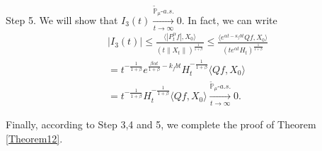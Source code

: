\documentclass[12pt]{amsart}
\theoremstyle{plain}
\theoremstyle{definition}
\numberwithin{equation}{section}
\begin{document}
	Step 5. We will show that $I_3(t) \xrightarrow[t\to \infty]{\tilde {\mathbb P}_\mu \text{-} a.s.} 0$. 
	In fact, we can write
\begin{align}
	&|I_3(t)| 
	\leq \frac{\langle |P^\alpha_tf|,X_0\rangle}{(t\|X_t\|)^{\frac{1}{1+\beta}}}
	\leq \frac{\langle e^{\alpha t - \kappa_f b t}Qf,X_0\rangle}{(te^{\alpha t} H_t)^{\frac{1}{1+\beta}}}
	\\& = t^{-\frac{1}{1+\beta}} e^{\frac{\beta \alpha t}{1+\beta} - k_fbt} H_t^{-\frac{1}{1+\beta}} \langle Qf,X_0\rangle
	\\& = t^{-\frac{1}{1+\beta}} H_t^{-\frac{1}{1+\beta}} \langle Qf,X_0\rangle
	\xrightarrow[t\to \infty]{\tilde {\mathbb P}_\mu \text{-} a.s.} 0.
\end{align}

	Finally, according to Step 3,4 and 5, we complete the proof of Theorem \ref{Theorem12}.
\end{document}
